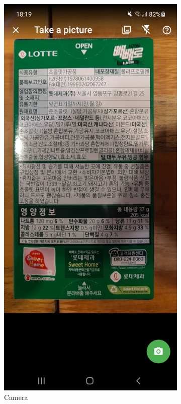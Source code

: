 \begin{figure}[h]
\begin{subfigure}{0.5\textwidth}
        \includegraphics[width=0.9\linewidth]{Figures/Screenshot/camera.jpg} 
        \caption{Camera}
        \label{fig:camera}
    \end{subfigure}
    \begin{subfigure}{0.5\textwidth}

\end{subfigure}
\end{figure}
